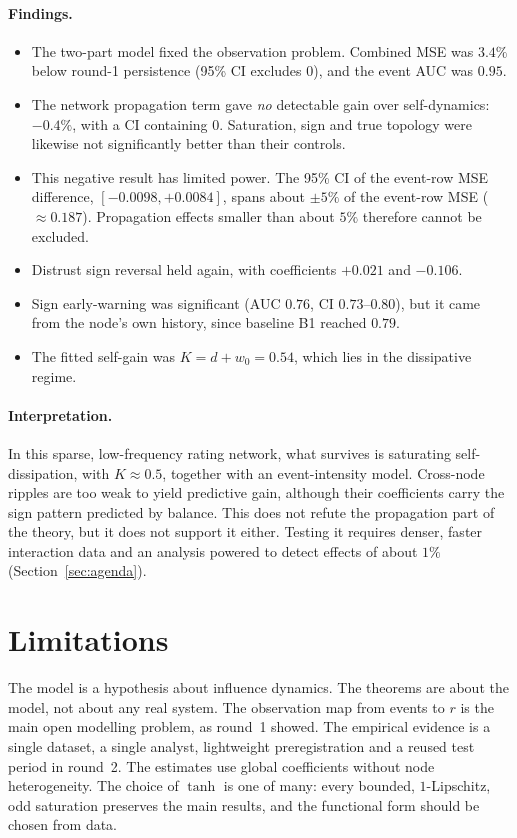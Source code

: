 \documentclass[11pt]{article}
\theoremstyle{definition}
\theoremstyle{remark}
\begin{document}
\paragraph{Findings.}
\begin{itemize}
\item The two-part model fixed the observation problem. Combined MSE was $3.4\%$ below round-1
      persistence (95\% CI excludes 0), and the event AUC was $0.95$.
\item The network propagation term gave \emph{no} detectable gain over self-dynamics: $-0.4\%$, with a
      CI containing 0. Saturation, sign and true topology were likewise not significantly better than
      their controls.
\item This negative result has limited power. The 95\% CI of the event-row MSE difference,
      $[-0.0098,+0.0084]$, spans about $\pm5\%$ of the event-row MSE ($\approx0.187$). Propagation
      effects smaller than about $5\%$ therefore cannot be excluded.
\item Distrust sign reversal held again, with coefficients $+0.021$ and $-0.106$.
\item Sign early-warning was significant (AUC $0.76$, CI $0.73$--$0.80$), but it came from the node's own
      history, since baseline B1 reached $0.79$.
\item The fitted self-gain was $K=d+w_0=0.54$, which lies in the dissipative regime.
\end{itemize}

\paragraph{Interpretation.} In this sparse, low-frequency rating network, what survives is saturating
self-dissipation, with $K\approx0.5$, together with an event-intensity model. Cross-node ripples are
too weak to yield predictive gain, although their coefficients carry the sign pattern predicted by
balance. This does not refute the propagation part of the theory, but it does not support it either.
Testing it requires denser, faster interaction data and an analysis powered to detect effects of
about $1\%$ (Section~\ref{sec:agenda}).

\section{Limitations}

The model is a hypothesis about influence dynamics. The theorems are about the model, not about any
real system. The observation map from events to $r$ is the main open modelling problem, as round~1
showed. The empirical evidence is a single dataset, a single analyst, lightweight preregistration and a
reused test period in round~2. The estimates use global coefficients without node heterogeneity. The
choice of $\tanh$ is one of many: every bounded, $1$-Lipschitz, odd saturation preserves the main
results, and the functional form should be chosen from data.
\end{document}

